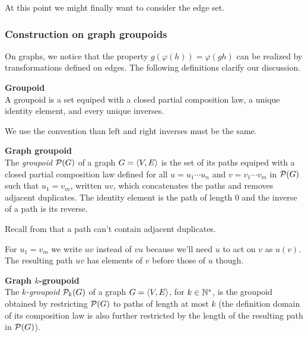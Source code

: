 At this point we might finally want to consider the edge set.

\subsubsection{Construction on graph groupoids}

On graphs, we notice that the property $g(\varphi(h)) = \varphi(gh)$ can be realized by transformations defined on edges. The following definitions clarify our discussion.

\begin{definition}\textbf{Groupoid}\\
A groupoid is a set equiped with a closed partial composition law, a unique identity element, and every unique inverses.
\end{definition}

\begin{remark}We use the convention than left and right inverses must be the same.
\end{remark}

\begin{definition}\textbf{Graph groupoid}\\
The \emph{groupoid} $\mathcal{P}(G)$ of a graph $G = \langle V, E \rangle$ is the set of its paths equiped with a closed partial composition law defined for all $u = u_1 \cdots u_n$ and $v = v_1 \cdots v_m$ in $\mathcal{P}(G)$ such that $u_1 = v_m$, written $uv$, which concatenates the paths and removes adjacent duplicates. The identity element is the path of length $0$ and the inverse of a path is its reverse.
\end{definition}

\begin{remark}Recall from  that a path can't contain adjacent duplicates.
\end{remark}

\begin{remark}For $u_1=v_m$ we write $uv$ instead of $vu$ because we'll need $u$ to act on $v$ as $u(v)$. The resulting path $uv$ has elements of $v$ before those of $u$ though.
\end{remark}

\begin{definition}\textbf{Graph $k$-groupoid}\\
The \emph{$k$-groupoid} $\mathcal{P}_k(G)$ of a graph $G = \langle V, E \rangle$, for $k \in \mathbb{N}^*$, is the groupoid obtained by restricting $\mathcal{P}(G)$ to paths of length at most $k$ (the definition domain of its composition law is also further restricted by the length of the resulting path in $\mathcal{P}(G)$).
\end{definition}


